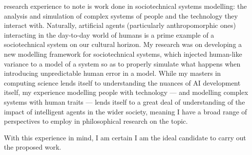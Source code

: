  research experience to note is work done in sociotechnical systems modelling: the analysis and simulation of complex systems of people and the technology they interact with. Naturally, artificial agents (particularly anthropomorphic ones) interacting in the day-to-day world of humans is a prime example of a sociotechnical system on our cultural horizon. My research was on developing a new modelling framework for sociotechnical systems, which injected human-like variance to a model of a system so as to properly simulate what happens when introducing unpredictable human error in a model. While my masters in computing science lends itself to understanding the nuances of AI development itself, my experience modelling people with technology --- and modelling complex systems with human traits --- lends itself to a great deal of understanding of the impact of intelligent agents in the wider society, meaning I have a broad range of perspectives to employ in philosophical research on the topic.\par

\begin{centering}
    With this experience in mind, I am certain I am the ideal candidate to carry out the proposed work.
\end{centering}


